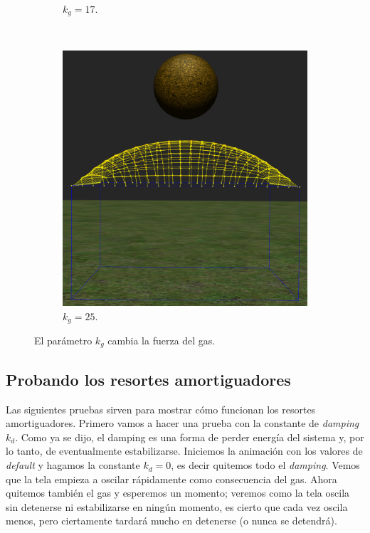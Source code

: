 \begin{figure}
\begin{subfigure}[b]{0.30\textwidth}
    \caption{$k_g=17$.}
  \end{subfigure}
~
  \begin{subfigure}[b]{0.30\textwidth}
    \includegraphics[width=\textwidth]{Img/04/varPress3}
    \caption{$k_g=25$.}
  \end{subfigure}
 \caption[Experimento: Variar la fuerza del gas]{El parámetro $k_g$ cambia la fuerza del gas.} 
 \label{pres:testVar}
\end{figure}

\subsection{Probando los resortes amortiguadores}
Las siguientes pruebas sirven para mostrar cómo funcionan los resortes amortiguadores.
Primero vamos a hacer una prueba con la constante de \emph{\textenglish{damping}} $k_d$.
Como ya se dijo, el damping es una forma de perder energía del sistema y, por lo tanto, de eventualmente estabilizarse.
Iniciemos la animación con los valores de \emph{\textenglish{default}} y hagamos la constante $k_d=0$, es decir quitemos todo el \emph{\textenglish{damping}}.
Vemos que la tela empieza a oscilar rápidamente como consecuencia del gas.
Ahora quitemos también el gas y esperemos un momento; veremos como la tela oscila sin detenerse ni estabilizarse en ningún momento, es cierto que cada vez oscila menos, pero ciertamente tardará mucho en detenerse (o nunca se detendrá).

